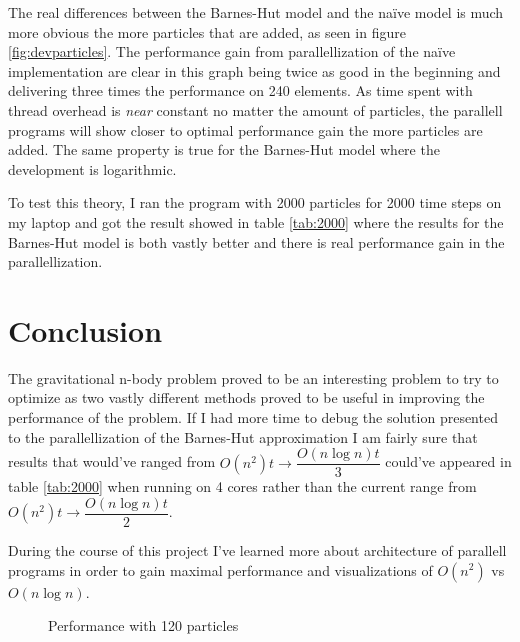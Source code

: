 \documentclass[titlepage,a4paper,12pt]{article}
\begin{document}
The real differences between the Barnes-Hut model and
the na\"{i}ve model is much more obvious the more particles that are added,
as seen in figure \ref{fig:devparticles}. The performance gain from
parallellization of the na\"{i}ve implementation are clear in this graph
being twice as good in the beginning and delivering three times the performance
on 240 elements. As time spent with thread overhead is \textit{near} constant
no matter the amount of particles, the parallell programs will show closer to
optimal performance gain the more particles are added. The same property is true
for the Barnes-Hut model where the development is logarithmic.

To test this theory, I ran the program with 2000 particles for 2000 time steps
on my laptop and got the result showed in table \ref{tab:2000} where the results
for the Barnes-Hut model is both vastly better and there is real performance
gain in the parallellization.

\section{Conclusion}

The gravitational n-body problem proved to be an interesting problem to try to
optimize as two vastly different methods proved to be useful in improving the 
performance of the problem. If I had more time to debug the solution presented
to the parallellization of the Barnes-Hut approximation I am fairly sure that
results that would've ranged from $O(n^2)t \rightarrow \dfrac{O(n \log n)t}{3}$
could've appeared in table \ref{tab:2000} when running on 4 cores rather than
the current range from $O(n^2)t \rightarrow \dfrac{O(n \log n)t}{2}$.

During the course of this project I've learned more about architecture of
parallell programs in order to gain maximal performance and visualizations
of $O(n^2)$ vs $O(n \log n)$.

\begin{figure}
\begin{center}
\end{center}

\caption{Performance with 120 particles}
\label{fig:120}
\end{figure}
\end{document}
